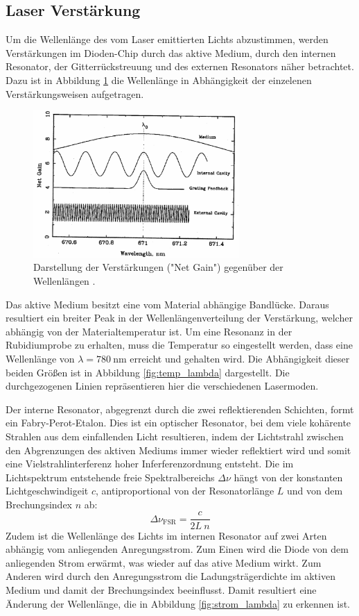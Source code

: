 \subsection{Laser Verstärkung}
Um die Wellenlänge des vom Laser emittierten Lichts abzustimmen, werden Verstärkungen im
Dioden-Chip durch das aktive Medium, durch den internen Resonator, der Gitterrückstreuung
und des externen Resonators näher betrachtet. Dazu ist in Abbildung \ref{fig:net_gain}
die Wellenlänge in Abhängigkeit der einzelenen Verstärkungsweisen aufgetragen.
\begin{figure}[htb]
  \centering
  \includegraphics[width=0.7\textwidth, angle=1, origin=c]{images/gain-lambda.pdf}
  \caption{Darstellung der Verstärkungen ("Net Gain") gegenüber der Wellenlängen
  \cite{anleitung}.}
  \label{fig:net_gain}
\end{figure}

Das aktive Medium besitzt eine vom Material abhängige Bandlücke. Daraus resultiert
ein breiter Peak in der Wellenlängenverteilung der Verstärkung, welcher abhängig von der
Materialtemperatur ist. Um eine Resonanz in der Rubidiumprobe zu erhalten, muss
die Temperatur so eingestellt werden, dass eine Wellenlänge von $\lambda = \SI{780}{\nano\meter}$
erreicht und gehalten wird. Die Abhängigkeit dieser beiden Größen ist in Abbildung
\ref{fig:temp_lambda} dargestellt. Die durchgezogenen Linien repräsentieren hier
die verschiedenen Lasermoden.

Der interne Resonator, abgegrenzt durch die zwei reflektierenden Schichten, formt ein
Fabry-Perot-Etalon. Dies ist ein optischer Resonator, bei dem viele kohärente Strahlen
aus dem einfallenden Licht resultieren, indem der Lichtstrahl zwischen den
Abgrenzungen des aktiven Mediums immer wieder reflektiert wird und somit eine
Vielstrahlinterferenz hoher Inferferenzordnung entsteht. Die im Lichtspektrum
entstehende freie Spektralbereichs $\Delta\nu$ hängt von der konstanten Lichtgeschwindigeit $c$,
antiproportional von der Resonatorlänge $L$ und von dem Brechungsindex $n$ ab:
\begin{equation}
  \Delta\nu_\text{FSR} = \frac{c}{2L\:n}
\end{equation}
Zudem ist die Wellenlänge des Lichts im internen Resonator auf zwei Arten abhängig
vom anliegenden Anregungsstrom. Zum Einen wird die Diode von dem anliegenden Strom
erwärmt, was wieder auf das ative Medium wirkt. Zum Anderen wird durch den Anregungsstrom
die Ladungsträgerdichte im aktiven Medium und damit der Brechungsindex beeinflusst.
Damit resultiert eine Änderung der Wellenlänge, die in Abbildung \ref{fig:strom_lambda}
zu erkennen ist.

